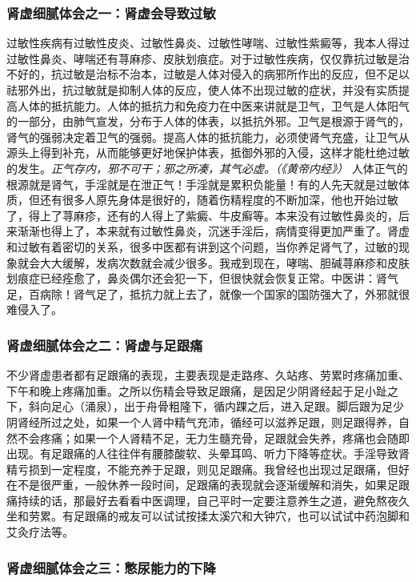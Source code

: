 \subsubsection{肾虚细腻体会之一：肾虚会导致过敏}

过敏性疾病有过敏性皮炎、过敏性鼻炎、过敏性哮喘、过敏性紫癜等，我本人得过过敏性鼻炎、哮喘还有荨麻疹、皮肤划痕症。对于过敏性疾病，仅仅靠抗过敏是治不好的，抗过敏是治标不治本，过敏是人体对侵入的病邪所作出的反应，但不足以祛邪外出，抗过敏就是抑制人体的反应，使人体不出现过敏的症状，并没有实质提高人体的抵抗能力。人体的抵抗力和免疫力在中医来讲就是卫气，卫气是人体阳气的一部分，由肺气宣发，分布于人体的体表，以抵抗外邪。卫气是根源于肾气的，肾气的强弱决定着卫气的强弱。提高人体的抵抗能力，必须使肾气充盛，让卫气从源头上得到补充，从而能够更好地保护体表，抵御外邪的入侵，这样才能杜绝过敏的发生。\textit{正气存内，邪不可干；邪之所凑，其气必虚。（《黄帝内经》）} 人体正气的根源就是肾气，手淫就是在泄正气！手淫就是累积负能量！有的人先天就是过敏体质，但还有很多人原先身体是很好的，随着伤精程度的不断加深，他也开始过敏了，得上了荨麻疹，还有的人得上了紫癜、牛皮癣等。本来没有过敏性鼻炎的，后来渐渐也得上了，本来就有过敏性鼻炎，沉迷手淫后，病情变得更加严重了。肾虚和过敏有着密切的关系，很多中医都有讲到这个问题，当你养足肾气了，过敏的现象就会大大缓解，发病次数就会减少很多。我戒到现在，哮喘、胆碱荨麻疹和皮肤划痕症已经痊愈了，鼻炎偶尔还会犯一下，但很快就会恢复正常。中医讲：肾气足，百病除！肾气足了，抵抗力就上去了，就像一个国家的国防强大了，外邪就很难侵入了。

\subsubsection{肾虚细腻体会之二：肾虚与足跟痛}

不少肾虚患者都有足跟痛的表现，主要表现是走路疼、久站疼、劳累时疼痛加重、下午和晚上疼痛加重。之所以伤精会导致足跟痛，是因足少阴肾经起于足小趾之下，斜向足心（涌泉），出于舟骨粗隆下，循内踝之后，进入足跟。脚后跟为足少阴肾经所过之处，如果一个人肾中精气充沛，循经可以滋养足跟，则足跟得养，自然不会疼痛；如果一个人肾精不足，无力生髓充骨，足跟就会失养，疼痛也会随即出现。有足跟痛的人往往伴有腰膝酸软、头晕耳鸣、听力下降等症状。手淫导致肾精亏损到一定程度，不能充养于足跟，则见足跟痛。我曾经也出现过足跟痛，但好在不是很严重，一般休养一段时间，足跟痛的表现就会逐渐缓解和消失，如果足跟痛持续的话，那最好去看看中医调理，自己平时一定要注意养生之道，避免熬夜久坐和劳累。有足跟痛的戒友可以试试按揉太溪穴和大钟穴，也可以试试中药泡脚和艾灸疗法等。

\subsubsection{肾虚细腻体会之三：憋尿能力的下降}

